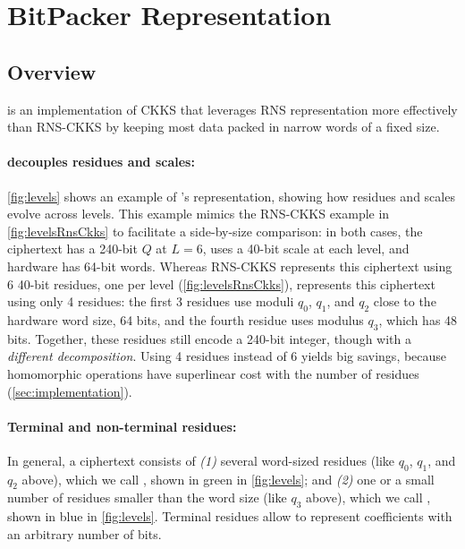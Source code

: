 \section{BitPacker Representation}
\vspace{-0.05in}
\subsection{Overview}
\label{sec:overview}

\name is an implementation of CKKS that leverages RNS representation more
effectively than RNS-CKKS by keeping most data packed in narrow words of a
fixed size.


\figLevelsBitPacker

\paragraph{\name decouples residues and scales:}
\autoref{fig:levels} shows an example of \name's representation, showing how
residues and scales evolve across levels.
This example mimics the RNS-CKKS example in \autoref{fig:levelsRnsCkks}
to facilitate a side-by-size comparison: in both cases, the ciphertext has a
240-bit $Q$ at $L=6$, uses a 40-bit scale at each level, and hardware has
64-bit words.
Whereas RNS-CKKS represents this ciphertext using 6 40-bit residues, one
per level (\autoref{fig:levelsRnsCkks}), \name represents this ciphertext using
only 4 residues: the first 3 residues use moduli $q_0$, $q_1$, and $q_2$ close
to the hardware word size, 64 bits, and the fourth residue uses modulus $q_3$,
which has 48 bits.
Together, these residues still encode a 240-bit integer, though with a
\emph{different decomposition}.
Using 4 residues instead of 6 yields big savings, because homomorphic operations 
have superlinear cost with the number of residues (\autoref{sec:implementation}).

\paragraph{Terminal and non-terminal residues:}
In general, a \name ciphertext consists of \emph{(1)} several word-sized
residues (like $q_0$, $q_1$, and $q_2$ above), which we call
, shown in green in \autoref{fig:levels};
and \emph{(2)} one or a small number of residues smaller than the word size
(like $q_3$ above), which we call , shown in blue in
\autoref{fig:levels}.
Terminal residues allow \name to represent coefficients with an arbitrary
number of bits.

